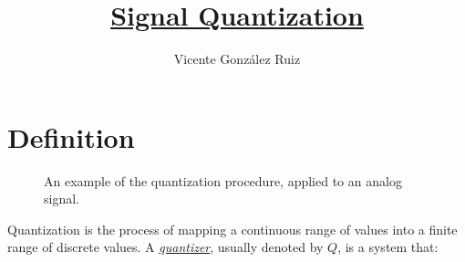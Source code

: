 
\title{\href{https://github.com/vicente-gonzalez-ruiz/signal_quantization}{Signal Quantization}}

\author{Vicente González Ruiz}

\maketitle
\tableofcontents

\section{Definition}

\begin{figure}
  \caption{An example of the quantization procedure, applied to an
    analog signal.}
  \label{fig:cuantif}
\end{figure}

Quantization is the process of mapping a continuous range of values
into a finite range of discrete values. A
\href{https://en.wikipedia.org/wiki/Quantization_(signal_processing)}{\emph{quantizer}},
usually denoted by $Q$, is a system that:

